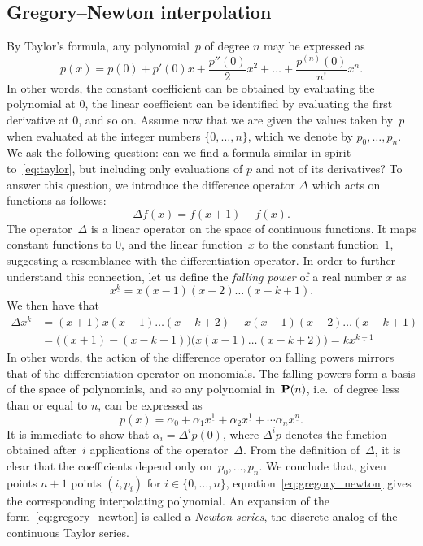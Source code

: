 \subsection{Gregory--Newton interpolation}
By Taylor's formula,
any polynomial~$p$ of degree $n$ may be expressed as
\begin{equation}
    \label{eq:taylor}
    p(x) = p(0) + p'(0) x + \frac{p''(0)}{2} x^2 + \dotsc + \frac{p^{(n)}(0)}{n!} x^n.
\end{equation}
In other words, the constant coefficient can be obtained by evaluating the polynomial at 0,
the linear coefficient can be identified by evaluating the first derivative at 0,
and so on.
Assume now that we are given the values taken by~$p$ when evaluated at the integer numbers $\{0, \dotsc, n\}$,
which we denote by $p_0, \dotsc, p_n$.
We ask the following question:
can we find a formula similar in spirit to~\eqref{eq:taylor},
but including only evaluations of $p$ and not of its derivatives?
To answer this question, we introduce the difference operator $\Delta$ which acts on functions as follows:
\[
    \Delta f(x) = f(x+1) - f(x).
\]
The operator~$\Delta$ is a linear operator on the space of continuous functions.
It maps constant functions to 0,
and the linear function~$x$ to the constant function~$1$,
suggesting a resemblance with the differentiation operator.
In order to further understand this connection,
let us define the \emph{falling power} of a real number $x$ as
\[
    x^{\underline{k}} = x (x-1) (x-2) \dots (x-k+1).
\]
We then have that
\begin{align*}
    \Delta x^{\underline{k}}
    &= (x+1) x (x-1) \dots (x-k+2) - x (x-1) (x-2) \dots (x-k+1) \\
    &= \bigl((x+1) - (x-k+1)\bigr) \bigl(x (x-1) \dots (x-k+2)\bigr) = k x^{\underline{k-1}}
\end{align*}
In other words,
the action of the difference operator on falling powers mirrors that of the differentiation operator on monomials.
The falling powers form a basis of the space of polynomials,
and so any polynomial in~$\mathbf P(n)$, i.e.\ of degree less than or equal to $n$, can be expressed as
\begin{equation}
    \label{eq:gregory_newton}
    p(x) = \alpha_0 + \alpha_1 x^{\underline{1}} + \alpha_2 x^{\underline{1}} + \dotsb \alpha_n x^{\underline{n}}.
\end{equation}
It is immediate to show that $\alpha_i = \Delta^i p(0)$,
where $\Delta^i p$ denotes the function obtained after~$i$ applications of the operator~$\Delta$.
From the definition of~$\Delta$,
it is clear that the coefficients depend only on~$p_0, \dotsc, p_n$.
We conclude that, given points $n+1$ points $(i, p_i)$ for $i \in \{0, \dotsc, n\}$,
equation~\eqref{eq:gregory_newton} gives the corresponding interpolating polynomial.
An expansion of the form~\eqref{eq:gregory_newton} is called a \emph{Newton series},
the discrete analog of the continuous Taylor series.

